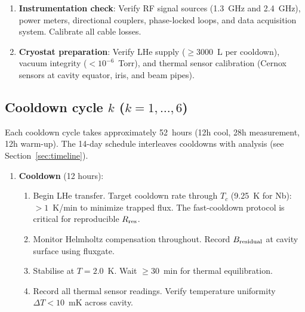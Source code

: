 \documentclass[11pt]{article}
\theoremstyle{definition}
\theoremstyle{remark}
\begin{document}
\begin{tcolorbox}[colback=white, colframe=black,
  title=\textbf{PHASE 0a: MEASUREMENT PROTOCOL (14 days, 6 cooldowns)},
  breakable]
\begin{enumerate}[label=\textbf{P\arabic*.}, leftmargin=2cm]
\item \textbf{Instrumentation check}: Verify RF signal sources
  (1.3~GHz and 2.4~GHz), power meters, directional couplers,
  phase-locked loops, and data acquisition system. Calibrate all
  cable losses.

\item \textbf{Cryostat preparation}: Verify LHe supply ($\geq 3000$~L
  per cooldown), vacuum integrity ($< 10^{-6}$~Torr), and thermal
  sensor calibration (Cernox sensors at cavity equator, iris, and
  beam pipes).
\end{enumerate}


\subsection*{Cooldown cycle $k$ ($k = 1, \ldots, 6$)}

Each cooldown cycle takes approximately 52~hours (12h cool, 28h
measurement, 12h warm-up). The 14-day schedule interleaves
cooldowns with analysis (see Section~\ref{sec:timeline}).

\begin{enumerate}[label=\textbf{C\arabic*.}, leftmargin=2cm]

\item \textbf{Cooldown} (12 hours):
  \begin{enumerate}[nosep, label=(\alph*)]
  \item Begin LHe transfer. Target cooldown rate through $T_c$
    (9.25~K for Nb): $> 1$~K/min to minimize trapped flux. The
    fast-cooldown protocol is critical for reproducible
    $R_{\rm res}$.
  \item Monitor Helmholtz compensation throughout. Record
    $B_{\rm residual}$ at cavity surface using fluxgate.
  \item Stabilise at $T = 2.0$~K. Wait $\geq 30$~min for thermal
    equilibration.
  \item Record all thermal sensor readings. Verify temperature
    uniformity $\Delta T < 10$~mK across cavity.
  \end{enumerate}


\end{enumerate}
\end{tcolorbox}
\end{document}
